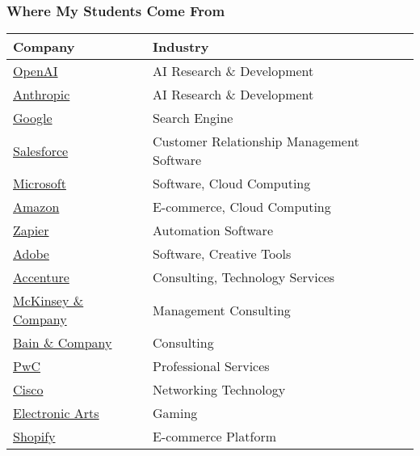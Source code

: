 {    \begin{frame}
        \frametitle{Where My Students Come From}
        \begin{table}
        \small
        \begin{tabular}{ll}
            \textbf{Company} & \textbf{Industry} \\
            \hline
            \textcolor{blue}{\href{https://openai.com}{OpenAI}} & AI Research \& Development \\
            \textcolor{blue}{\href{https://anthropic.com}{Anthropic}} & AI Research \& Development \\
            \textcolor{blue}{\href{https://google.com}{Google}} & Search Engine \\
            \textcolor{blue}{\href{https://salesforce.com}{Salesforce}} & Customer Relationship Management Software \\
            \textcolor{blue}{\href{https://microsoft.com}{Microsoft}} & Software, Cloud Computing \\
            \textcolor{blue}{\href{https://amazon.com}{Amazon}} & E-commerce, Cloud Computing \\
            \textcolor{blue}{\href{https://zapier.com}{Zapier}} & Automation Software \\
            \textcolor{blue}{\href{https://adobe.com}{Adobe}} & Software, Creative Tools \\
            \textcolor{blue}{\href{https://accenture.com}{Accenture}} & Consulting, Technology Services \\
            \textcolor{blue}{\href{https://mckinsey.com}{McKinsey \& Company}} & Management Consulting \\
            \textcolor{blue}{\href{https://bain.com}{Bain \& Company}} & Consulting \\
            \textcolor{blue}{\href{https://pwc.com}{PwC}} & Professional Services \\
            \textcolor{blue}{\href{https://cisco.com}{Cisco}} & Networking Technology \\
            \textcolor{blue}{\href{https://ea.com}{Electronic Arts}} & Gaming \\
            \textcolor{blue}{\href{https://shopify.com}{Shopify}} & E-commerce Platform \\
        \end{tabular}
        \end{table}
    \end{frame}
} 